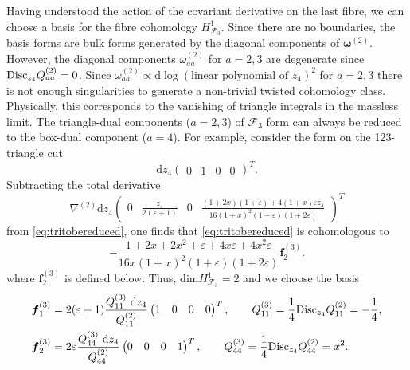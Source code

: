 \documentclass[11pt]{article}
\renewcommand{\d}{\text{d}}
\newcommand{\be}{\begin{equation}}
\newcommand{\ee}{\end{equation}}
\newcommand{\F}{\mathcal{F}}
\newcommand{\vep}{\varepsilon}
\newcommand{\disc}{{\rm Disc}}
\newcommand{\bs}[1]{\boldsymbol{#1}}
\newcommand{\mat}[1]{\underline{\boldsymbol{#1}}}
\begin{document}
Having understood the action of the covariant derivative on the last fibre, we can choose a basis for the fibre cohomology $H^1_{\F_3}$. Since there are no boundaries, the basis forms are bulk forms generated by the diagonal components of $\mat{\omega}^{(2)}$. However, the diagonal components $\omega^{(2)}_{aa}$ for $a=2,3$ are degenerate since $\disc_{z_4}Q^{(2)}_{aa} = 0$. Since $\omega^{(2)}_{aa} \propto \d\log(\text{linear polynomial of } z_4)^2$ for $a=2,3$ there is not enough singularities to generate a non-trivial twisted cohomology class. Physically, this corresponds to the vanishing of triangle integrals in the massless limit. The triangle-dual components ($a=2,3$) of $\F_3$ form can always be reduced to the box-dual component ($a=4$). For example, consider the form on the 123-triangle cut
\be	\label{eq:tritobereduced}
	\d z_4 \begin{pmatrix}0&1&0&0\end{pmatrix}^T.
\ee 
Subtracting the total derivative 
\be
	\nabla^{(2)} \d z_4 
	\begin{pmatrix}
		0 
		& \frac{z_4}{2(\vep+1)}
		& 0
		& \frac{(1{+}2x)(1{+}\vep)+4(1+x)\vep z_4}{16(1+x)^2(1+\vep)(1+2\vep)}
	\end{pmatrix}^T
\ee
from \eqref{eq:tritobereduced}, one finds that \eqref{eq:tritobereduced} is cohomologous to 
\be
	- \frac{1+2x+2x^2+\vep+4x\vep+4x^2\vep}{16x(1+x)^2(1+\vep)(1+2\vep)} 
	\bs{f}^{(3)}_2
	.
\ee
where $\bs{f}^{(3)}_2$ is defined below. Thus, $\text{dim}H^1_{\F_3}=2$ and we choose the basis 
\begin{align}
	\bs{f}^{(3)}_1 &= 2(\vep+1) \frac{Q^{(3)}_{11}\ \d z_4}{Q^{(2)}_{11}} \begin{pmatrix}1&0&0&0\end{pmatrix}^T, 
	\qquad 
	Q^{(3)}_{11} = \frac14 \disc_{z_4} Q^{(2)}_{11} = - \frac14,
	\\ 
	\bs{f}^{(3)}_2 &= 2\vep \frac{Q^{(3)}_{44}\ \d z_4}{Q^{(2)}_{44}} \begin{pmatrix}0&0&0&1\end{pmatrix}^T, 
	\qquad 
	Q^{(3)}_{44} = \frac14 \disc_{z_4} Q^{(2)}_{44} = x^2.
\end{align}


\end{document}
